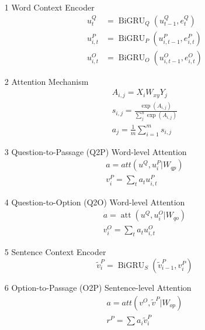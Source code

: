\documentclass[a4paper,UTF8]{article}
\numberwithin{equation}{section}
\begin{document}
\begin{enumerate}
	\item[1] Word Context Encoder
	\begin{equation}
	\begin{aligned} u_{t}^{Q} &=\operatorname{BiGRU}_{Q}\left(u_{t-1}^{Q}, e_{t}^{Q}\right) \\ u_{i, t}^{P} &=\operatorname{BiGRU}_{P}\left(u_{i, t-1}^{P}, e_{i, t}^{P}\right) \\ u_{i, t}^{O} &=\operatorname{BiGRU}_{O}\left(u_{i, t-1}^{O}, e_{i, t}^{O}\right) \end{aligned}
	\end{equation}
	\item[2] Attention Mechanism
	\begin{equation}
	\begin{array}{c}{A_{i, j}=X_{i} W_{x y} Y_{j}} \\ 
	{s_{i, j}=\frac{\exp \left(A_{i, j}\right)}{\sum_{j}^{n} \exp \left(A_{i, j}\right)}}\\
	a_{j}=\frac{1}{m} \sum_{i=1}^{m} s_{i, j}
	\end{array}
	\end{equation}
	\item[3] Question-to-Passage (Q2P) Word-level Attention
	\begin{equation}
	\begin{array}{c}{a=a t t\left(u^{Q}, u_{i}^{P} | W_{q p}\right)} \\ {v_{i}^{P}=\sum_{t} a_{t} u_{i, t}^{P}}\end{array}
	\end{equation}
	\item[4] Question-to-Option (Q2O) Word-level Attention
	\begin{equation}
	\begin{array}{c}{a=\operatorname{att}\left(u^{Q}, u_{i}^{O} | W_{q o}\right)} \\ {v_{i}^{O}=\sum_{t} a_{t} u_{i, t}^{O}}\end{array}
	\end{equation}
	\item[5] Sentence Context Encoder
	\begin{equation}
		\tilde{v}_{i}^{P}=\operatorname{BiGRU}_{S}\left(\tilde{v}_{i-1}^{P}, v_{i}^{P}\right)
		\end{equation}
	\item[6] Option-to-Passage (O2P) Sentence-level Attention
	\begin{equation}
	\begin{array}{c}{a=a t t\left(v^{O}, \tilde{v}^{P} | W_{o p}\right)} \\ {r^{P}=\sum a_{i} \tilde{v}_{i}^{P}}\end{array}

\end{equation}
\end{enumerate}
\end{document}
